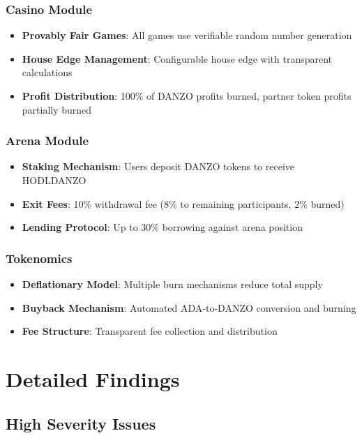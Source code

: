 \documentclass[11pt,a4paper]{article}
\begin{document}
\subsubsection{Casino Module}
\begin{itemize}
    \item \textbf{Provably Fair Games}: All games use verifiable random number generation
    \item \textbf{House Edge Management}: Configurable house edge with transparent calculations
    \item \textbf{Profit Distribution}: 100\% of DANZO profits burned, partner token profits partially burned
\end{itemize}

\subsubsection{Arena Module}
\begin{itemize}
    \item \textbf{Staking Mechanism}: Users deposit DANZO tokens to receive HODLDANZO
    \item \textbf{Exit Fees}: 10\% withdrawal fee (8\% to remaining participants, 2\% burned)
    \item \textbf{Lending Protocol}: Up to 30\% borrowing against arena position
\end{itemize}

\subsubsection{Tokenomics}
\begin{itemize}
    \item \textbf{Deflationary Model}: Multiple burn mechanisms reduce total supply
    \item \textbf{Buyback Mechanism}: Automated ADA-to-DANZO conversion and burning
    \item \textbf{Fee Structure}: Transparent fee collection and distribution
\end{itemize}

\section{Detailed Findings}

\subsection{High Severity Issues}
\end{document}
